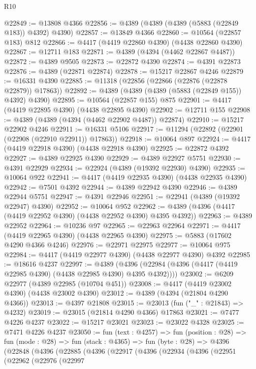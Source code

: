 \begin{lexlean}{R10}
\begin{coremodule}
@22849 := @13808 @4366
@22856 := @4389 (@4389 (@4389 (@5883 (@22849 @183)) @4392) @4390)
@22857 := @13849 @4366
@22860 := @10564 (@22857 @183) @812
@22866 := @4417 (@4419 @22860 @4390) (@4438 @22860 @4390)
@22867 := @12711 @183
@22871 := @4389 (@4394 (@4462 @22867 @4487))
@22872 := @4389 @9505
@22873 := @22872 @4390
@22874 := @4391 @22873
@22876 := @4389 (@22871 @22874)
@22878 := @15217 @22867 @4246
@22879 := @16331 @4390
@22885 := @11318 (@22856 (@22866 (@22876 (@22878 @22879)) @17863))
@22892 := @4389 (@4389 (@4389 (@5883 (@22849 @155)) @4392) @4390)
@22895 := @10564 (@22857 @155) @875
@22901 := @4417 (@4419 @22895 @4390) (@4438 @22895 @4390)
@22902 := @12711 @155
@22908 := @4389 (@4389 (@4394 (@4462 @22902 @4487)) @22874)
@22910 := @15217 @22902 @4246
@22911 := @16331 @5106
@22917 := @11294 (@22892 (@22901 (@22908 (@22910 @22911)) @17863))
@22918 := @10064 @897
@22924 := @4417 (@4419 @22918 @4390) (@4438 @22918 @4390)
@22925 := @22872 @4392
@22927 := @4389 @22925 @4390
@22929 := @4389 @22927 @5751
@22930 := @4391 @22929
@22934 := @22924 (@4389 (@19392 @22930) @4390)
@22935 := @10064 @922
@22941 := @4417 (@4419 @22935 @4390) (@4438 @22935 @4390)
@22942 := @7501 @4392
@22944 := @4389 @22942 @4390
@22946 := @4389 @22944 @5751
@22947 := @4391 @22946
@22951 := @22941 (@4389 (@19392 @22947) @4390)
@22952 := @10064 @952
@22962 := @4389 (@4396 (@4417 (@4419 @22952 @4390) (@4438 @22952 @4390) @4395 @4392))
@22963 := @4389 @22952
@22964 := @10236 @97
@22965 := @22963 @22964
@22971 := @4417 (@4419 @22965 @4390) (@4438 @22965 @4390)
@22975 := @5883 (@17602 @4290 @4366 @4246)
@22976 := @22971 @22975
@22977 := @10064 @975
@22984 := @4417 (@4419 @22977 @4390) (@4438 @22977 @4390) @4392
@22985 := @18616 @4237
@22997 := @4389
    (@4396 (@22984 (@4396 (@4417 (@4419 @22985 @4390) (@4438 @22985 @4390) @4395 @4392))))
@23002 := @6209 @22977 (@4389 @22985 (@10704 @451))
@23008 := @4417 (@4419 @23002 @4390) (@4438 @23002 @4390)
@23012 := @4389 (@4394 (@21804 @4290 @4366))
@23013 := @4397 @21808
@23015 := @23013 (fun ("_" : @21843) => @4232)
@23019 := @23015 (@21814 @4290 @4366) @17863
@23021 := @7477 @4226 @4237
@23022 := @15217 @23021
@23023 := @23022 @4328
@23025 := @7471 @4226 @4237
@23050 := fun (text : @4257) =>
  fun (position : @28) =>
  fun (mode : @28) =>
  fun (stack : @4365) =>
  fun (byte : @28) =>
  @4396
    (@22848
      (@4396
        (@22885
          (@4396
            (@22917
              (@4396
                (@22934
                  (@4396
                    (@22951
                      (@22962
                        (@22976
                          (@22997

\end{coremodule}
\end{lexlean}
